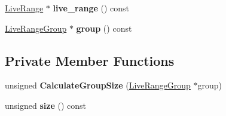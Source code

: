 \begin{DoxyCompactItemize}
\item 
\hyperlink{classv8_1_1internal_1_1compiler_1_1_live_range}{Live\+Range} $\ast$ {\bfseries live\+\_\+range} () const \hypertarget{classv8_1_1internal_1_1compiler_1_1_allocation_candidate_a4300af72689fb1aee4e87d1fdcf2ff77}{}\label{classv8_1_1internal_1_1compiler_1_1_allocation_candidate_a4300af72689fb1aee4e87d1fdcf2ff77}

\item 
\hyperlink{classv8_1_1internal_1_1compiler_1_1_live_range_group}{Live\+Range\+Group} $\ast$ {\bfseries group} () const \hypertarget{classv8_1_1internal_1_1compiler_1_1_allocation_candidate_a62e59d137fd609d39eb61cd3c07dbea7}{}\label{classv8_1_1internal_1_1compiler_1_1_allocation_candidate_a62e59d137fd609d39eb61cd3c07dbea7}

\end{DoxyCompactItemize}
\subsection*{Private Member Functions}
\begin{DoxyCompactItemize}
\item 
unsigned {\bfseries Calculate\+Group\+Size} (\hyperlink{classv8_1_1internal_1_1compiler_1_1_live_range_group}{Live\+Range\+Group} $\ast$group)\hypertarget{classv8_1_1internal_1_1compiler_1_1_allocation_candidate_a153265c65236606a92f80c60259e506f}{}\label{classv8_1_1internal_1_1compiler_1_1_allocation_candidate_a153265c65236606a92f80c60259e506f}

\item 
unsigned {\bfseries size} () const \hypertarget{classv8_1_1internal_1_1compiler_1_1_allocation_candidate_a0279df190b0bc0a7d77a82c4f2b28977}{}\label{classv8_1_1internal_1_1compiler_1_1_allocation_candidate_a0279df190b0bc0a7d77a82c4f2b28977}

\end{DoxyCompactItemize}
